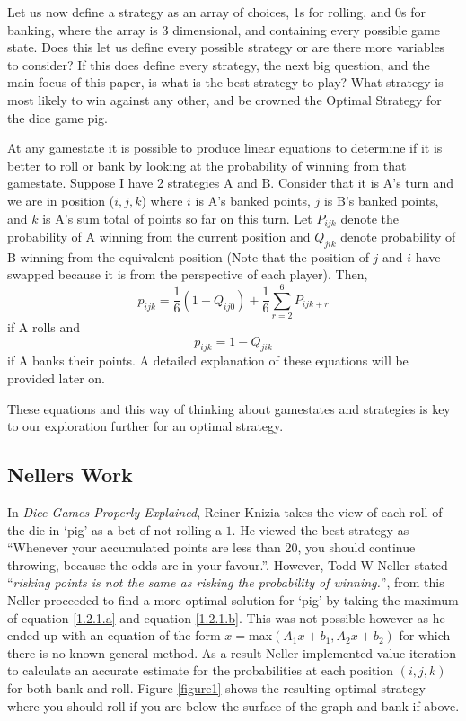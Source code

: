 \documentclass[a4paper,titlepage]{article}
\begin{document}
Let us now define a strategy as an array of choices, 1s for rolling, and 0s for banking, where the array is 3 dimensional, and containing every
possible game state.
Does this let us define every possible strategy or are there more variables to consider?
If this does define every strategy, the next big question, and the main focus of this paper, is what is the best strategy to play?
What strategy is most likely to win against any other, and be crowned the Optimal Strategy for the dice game pig.

At any gamestate it is possible to produce linear equations to determine if it is better to roll or bank by looking at the probability of winning from that gamestate.
Suppose I have 2 strategies A and B. Consider that it is A's turn and we are in position ($i,j,k$) where $i$ is A's banked points,
$j$ is B's banked points, and $k$ is A's sum total of points so far on this turn. Let $P_{ijk}$ denote the probability of A winning
from the current position and $Q_{jik}$ denote probability of B winning from the equivalent position (Note that the position of $j$ and $i$ have swapped because it is
from the perspective of each player). Then,
\begin{equation}\label{1.2.1.a}
p_{ijk} = \dfrac{1}{6} (1-Q_{ij0}) + \dfrac{1}{6}\sum^{6}_{r=2}P_{ijk+r}
\end{equation}
 if A rolls and
 \begin{equation}\label{1.2.1.b}
 p_{ijk} = 1-Q_{jik}
 \end{equation}
 if A banks their points. A detailed explanation of these equations will be provided later on.

 These equations and this way of thinking about gamestates and strategies is key to our exploration further for an optimal strategy.

\subsection{Nellers Work}
In \textit{Dice Games Properly Explained}, Reiner Knizia takes the view of each roll of the die in `pig' as a bet of not rolling a $1$.
He viewed the best strategy as ``Whenever your accumulated points are less than 20, you should continue throwing, because the odds are in your favour.''\cite{knizia2010dice}.
However, Todd W Neller stated ``\textit{risking points is not the same as risking the probability of winning.}''\cite{neller2004optimal},
from this Neller proceeded to find a more optimal solution for `pig' by taking the maximum of equation \ref{1.2.1.a} and equation \ref{1.2.1.b}.
This was not possible however as he ended up with an equation of the form $x=$max$ (A_1 x+b_1,A_2 x+b_2)$ for which there is no known general method.
As a result Neller implemented value iteration to calculate an accurate estimate for the probabilities at each position $(i,j,k)$ for both bank and roll.
Figure \ref{figure1} shows the resulting optimal strategy where you should roll if you are below the surface of the graph and bank if above.
\end{document}
